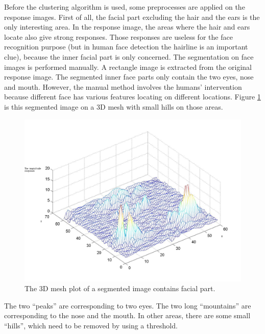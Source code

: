 Before the clustering algorithm is used, some preprocesses are applied on the response images. First of all, the facial part excluding the hair and the ears is the only interesting area. In the response image, the areas where the hair and ears locate also give strong responses. Those responses are useless for the face recognition purpose (but in human face detection the hairline is an important clue), because the inner facial part is only concerned. The segmentation on face images is performed manually. A rectangle image is extracted from the original response image. The segmented inner face parts only contain the two eyes, nose and mouth. However, the manual method involves the humans' intervention because different face has various features locating on different locations. \mbox{Figure} \ref{fig:3dMag} is this segmented image on a 3D mesh with small hills on those areas.
\begin{figure}[ht]
\begin{center}
  \includegraphics[width=\columnwidth]{ch3/figures/3dMagtitude.png}
\caption{The 3D mesh plot of a segmented image contains facial part.}
\label{fig:3dMag}
\end{center}
\end{figure} 
The two ``peaks'' are corresponding to two eyes. The two long ``mountains'' are corresponding to the nose and the mouth. In other areas, there are some small ``hills'', which need to be removed by using a threshold.

